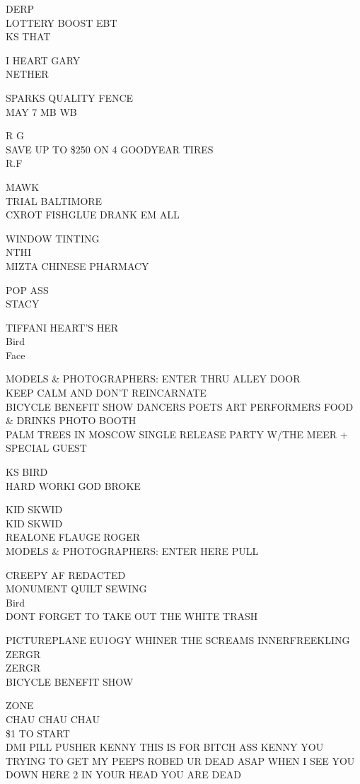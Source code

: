\documentclass[10pt,letterpaper]{article}
\begin{document}
DERP\\
LOTTERY BOOST EBT\\
KS THAT

I HEART GARY\\
NETHER

SPARKS QUALITY FENCE\\
MAY 7 MB WB

R G\\
SAVE UP TO \$250 ON 4 GOODYEAR TIRES\\
R.F

MAWK\\
TRIAL BALTIMORE\\
CXROT FISHGLUE DRANK EM ALL

WINDOW TINTING\\
NTHI\\
MIZTA CHINESE PHARMACY

POP ASS\\
STACY

TIFFANI HEART'S HER\\
Bird\\
Face

MODELS \& PHOTOGRAPHERS: ENTER THRU ALLEY DOOR\\
KEEP CALM AND DON'T REINCARNATE\\
BICYCLE BENEFIT SHOW DANCERS POETS ART PERFORMERS FOOD \& DRINKS PHOTO BOOTH\\
PALM TREES IN MOSCOW SINGLE RELEASE PARTY W/THE MEER + SPECIAL GUEST

KS BIRD\\
HARD WORKI GOD BROKE

KID SKWID\\
KID SKWID\\
REALONE FLAUGE ROGER\\
MODELS \& PHOTOGRAPHERS: ENTER HERE PULL

CREEPY AF REDACTED\\
MONUMENT QUILT SEWING\\
Bird\\
DONT FORGET TO TAKE OUT THE WHITE TRASH

PICTUREPLANE EU1OGY WHINER THE SCREAMS INNERFREEKLING\\
ZERGR\\
ZERGR\\
BICYCLE BENEFIT SHOW

ZONE\\
CHAU CHAU CHAU\\
\$1 TO START\\
DMI PILL PUSHER KENNY THIS IS FOR BITCH ASS KENNY YOU TRYING TO GET MY PEEPS ROBED UR DEAD ASAP WHEN I SEE YOU DOWN HERE 2 IN YOUR HEAD YOU ARE DEAD
\end{document}
